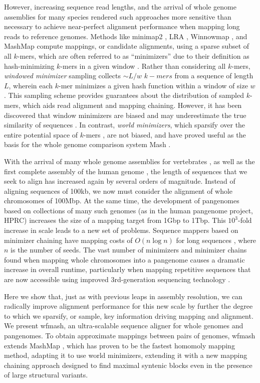 \documentclass{bioinfo}
\theoremstyle{definition}
\begin{document}
However, increasing sequence read lengths, and the arrival of whole genome assemblies for many species rendered such approaches more sensitive than necessary to achieve near-perfect alignment performance when mapping long reads to reference genomes.
Methods like minimap2 \citep{Li_2018}, LRA \citep{Ren_2021}, Winnowmap \citep{Jain_2020}, and MashMap \citep{Jain_2018} compute mappings, or candidate alignments, using a sparse subset of all $k$-mers, which are often referred to as ``minimizers'' due to their definition as hash-minimizing $k$-mers in a given window \citep{Roberts_2004}.
Rather than considering all $k$-mers, \textit{windowed minimizer} sampling collects $\sim L/w$ $k-mers$ from a sequence of length $L$, wherein each $k$-mer minimizes a given hash function within a window of size $w$.
This sampling scheme provides guarantees about the distribution of sampled $k$-mers, which aids read alignment and mapping chaining.
However, it has been discovered that window minimizers are biased and may underestimate the true similarity of sequences \citep{Belbasi_2022}.
In contrast, \textit{world minimizers}, which sparsify over the entire potential space of $k$-mers \citep{Broder_1997}, are not biased, and have proved useful as the basis for the whole genome comparison system Mash \citep{Ondov_2016}.

With the arrival of many whole genome assemblies for vertebrates \citep{Rhie_2021}, as well as the first complete assembly of the human genome \cite{Nurk_2022}, the length of sequences that we seek to align has increased again by several orders of magnitude.
Instead of aligning sequences of 100kb, we now must consider the alignment of whole chromosomes of 100Mbp.
At the same time, the development of pangenomes based on collections of many such genomes (as in the human pangenome project, HPRC) increases the size of a mapping target from 1Gbp to 1Tbp.
This $10^3$-fold increase in scale leads to a new set of problems. %
Sequence mappers based on minimizer chaining have mapping costs of $O(n \log n)$ for long sequences \citep{Jain_2022}, where $n$ is the number of seeds.
The vast number of minimizers and minimizer chains found when mapping whole chromosomes into a pangenome causes a dramatic increase in overall runtime, particularly when mapping repetitive sequences that are now accessible using improved 3rd-generation sequencing technology \citep{Logsdon_2021,Nurk_2022}.

Here we show that, just as with previous leaps in assembly resolution, we can radically improve alignment performance for this new scale by further the degree to which we sparsify, or sample, key information driving mapping and alignment.
We present wfmash, an ultra-scalable sequence aligner for whole genomes and pangenomes.
To obtain approximate mappings between pairs of genomes, wfmash extends MashMap \citep{Jain_2018}, which has proven to be the fastest homomoly mapping method, adapting it to use world minimizers, extending it with a new mapping chaining approach designed to find maximal syntenic blocks even in the presence of large structural variants.
\end{document}
